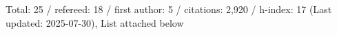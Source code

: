 Total: 25 / refereed: 18 / first author: 5 / citations: 2,920 / h-index: 17 (Last updated: 2025-07-30), List attached below